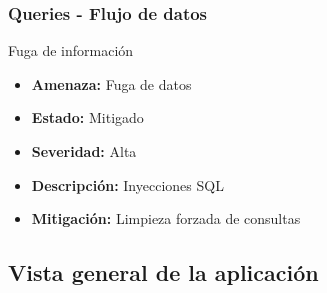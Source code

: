 \subsubsection{Queries - Flujo de datos}
Fuga de información
\begin{itemize}
    \item \textbf{Amenaza: } Fuga de datos
    \item \textbf{Estado: } Mitigado
    \item \textbf{Severidad: } Alta
    \item \textbf{Descripción: } Inyecciones SQL
    \item \textbf{Mitigación: } Limpieza forzada de consultas
\end{itemize}


\subsection{Vista general de la aplicación}